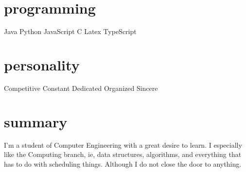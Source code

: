 \documentclass[]{friggeri-cv} %
\begin{document}
\begin{aside}
        \section{programming}
            Java\quad{\color{red} $\varheartsuit\varheartsuit\varheartsuit\varheartsuit\varheartsuit$}{\color{black} $\varheartsuit$}
            Python\quad{\color{red} $\varheartsuit\varheartsuit\varheartsuit$}{\color{black} $\varheartsuit\varheartsuit\varheartsuit$}
            JavaScript\quad{\color{red} $\varheartsuit\varheartsuit\varheartsuit\varheartsuit$}{\color{black} $\varheartsuit\varheartsuit$}
            C\quad{\color{red} $\varheartsuit\varheartsuit\varheartsuit\varheartsuit$}{\color{black} $\varheartsuit\varheartsuit$}
            Latex\quad{\color{red} $\varheartsuit\varheartsuit\varheartsuit\varheartsuit$}{\color{black} $\varheartsuit\varheartsuit$}
            TypeScript\quad{\color{red} $\varheartsuit\varheartsuit\varheartsuit\varheartsuit$}{\color{black} $\varheartsuit\varheartsuit$}
        \section{personality}
            Competitive\quad{\color{blue} $\varheartsuit\varheartsuit\varheartsuit\varheartsuit\varheartsuit$}{\color{black} $\varheartsuit$}
            Constant\quad{\color{blue} $\varheartsuit$}{\color{black} $\varheartsuit\varheartsuit\varheartsuit\varheartsuit\varheartsuit$}
            Dedicated\quad{\color{blue} $\varheartsuit\varheartsuit\varheartsuit\varheartsuit$}{\color{black} $\varheartsuit\varheartsuit$}
            Organized\quad{\color{blue} $\varheartsuit\varheartsuit\varheartsuit$}{\color{black} $\varheartsuit\varheartsuit\varheartsuit$}
            Sincere\quad{\color{blue} $\varheartsuit\varheartsuit\varheartsuit$}{\color{black} $\varheartsuit\varheartsuit$}
    \end{aside}




    \section{summary}

        I'm a student of Computer Engineering with a great desire to learn. I especially like the Computing branch, ie, data structures, algorithms, and everything that has to do with scheduling things. Although I do not close the door to anything.
\end{document}
